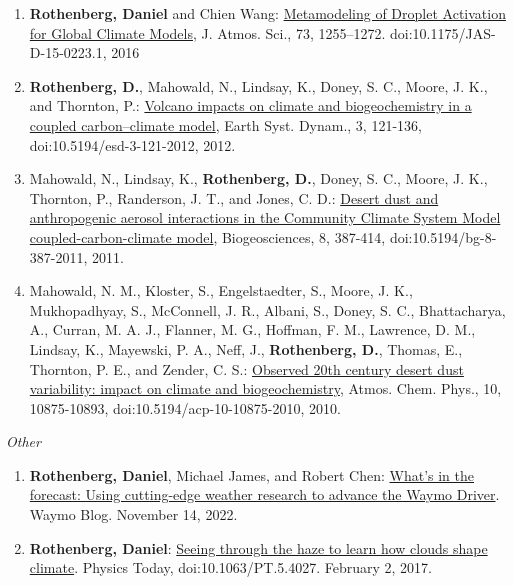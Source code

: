 \documentclass[11pt,letterpaper]{article}
\begin{document}
\begin{enumerate}[itemindent=-10pt]
 \item \textbf{Rothenberg, Daniel} and Chien Wang: \href{http://dx.doi.org/10.1175/JAS-D-15-0223.1}{Metamodeling of Droplet Activation for Global Climate Models}, J. Atmos. Sci., 73, 1255–1272. doi:10.1175/JAS-D-15-0223.1, 2016

 \item \textbf{Rothenberg, D.}, Mahowald, N., Lindsay, K., Doney, S. C., Moore, J. K., and Thornton, P.: \href{http://dx.doi.org/10.5194/esd-3-121-2012}{Volcano impacts on climate and biogeochemistry in a coupled carbon–climate model}, Earth Syst. Dynam., 3, 121-136, doi:10.5194/esd-3-121-2012, 2012.

 \item Mahowald, N., Lindsay, K., \textbf{Rothenberg, D.}, Doney, S. C., Moore, J. K., Thornton, P., Randerson, J. T., and Jones, C. D.: \href{http://dx.doi.org/10.5194/bg-8-387-2011}{Desert dust and anthropogenic aerosol interactions in the Community Climate System Model coupled-carbon-climate model}, Biogeosciences, 8, 387-414, doi:10.5194/bg-8-387-2011, 2011.

 \item Mahowald, N. M., Kloster, S., Engelstaedter, S., Moore, J. K., Mukhopadhyay, S., McConnell, J. R., Albani, S., Doney, S. C., Bhattacharya, A., Curran, M. A. J., Flanner, M. G., Hoffman, F. M., Lawrence, D. M., Lindsay, K., Mayewski, P. A., Neff, J., \textbf{Rothenberg, D.}, Thomas, E., Thornton, P. E., and Zender, C. S.: \href{http://dx.doi.org/10.5194/acp-10-10875-2010}{Observed 20th century desert dust variability: impact on climate and biogeochemistry}, Atmos. Chem. Phys., 10, 10875-10893, doi:10.5194/acp-10-10875-2010, 2010.
\end{enumerate}

\bigskip
\emph{Other}
\medskip
\begin{enumerate}[itemindent=-10pt]

\item \textbf{Rothenberg, Daniel}, Michael James, and Robert Chen: \href{https://waymo.com/blog/2022/11/using-cutting-edge-weather-research-to-advance-the-Waymo-Driver.html}{What’s in the forecast: Using cutting-edge weather research to advance the Waymo Driver}. Waymo Blog. November 14, 2022.

\item \textbf{Rothenberg, Daniel}: \href{http://physicstoday.scitation.org/do/10.1063/PT.5.4027/full/}{Seeing through the haze to learn how clouds shape climate}. Physics Today, doi:10.1063/PT.5.4027. February 2, 2017.

\end{enumerate}
\end{document}
